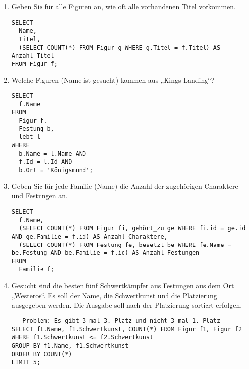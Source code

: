\documentclass{lehramt-informatik-aufgabe}
\begin{document}
\begin{enumerate}

%

\item Geben Sie für alle Figuren an, wie oft alle vorhandenen Titel
vorkommen.

\begin{antwort}
\begin{verbatim}
SELECT
  Name,
  Titel,
  (SELECT COUNT(*) FROM Figur g WHERE g.Titel = f.Titel) AS Anzahl_Titel
FROM Figur f;
\end{verbatim}
\end{antwort}

%

\item Welche Figuren (Name ist gesucht) kommen aus „Kings Landing“?

\begin{antwort}
\begin{verbatim}
SELECT
  f.Name
FROM
  Figur f,
  Festung b,
  lebt l
WHERE
  b.Name = l.Name AND
  f.Id = l.Id AND
  b.Ort = 'Königsmund';
\end{verbatim}
\end{antwort}

%

\item Geben Sie für jede Familie (Name) die Anzahl der zugehörigen
Charaktere und Festungen an.

\begin{antwort}
\begin{verbatim}
SELECT
  f.Name,
  (SELECT COUNT(*) FROM Figur fi, gehört_zu ge WHERE fi.id = ge.id AND ge.Familie = f.id) AS Anzahl_Charaktere,
  (SELECT COUNT(*) FROM Festung fe, besetzt be WHERE fe.Name = be.Festung AND be.Familie = f.id) AS Anzahl_Festungen
FROM
  Familie f;
\end{verbatim}
\end{antwort}

%

\item Gesucht sind die besten fünf Schwertkämpfer aus Festungen aus dem
Ort „Westeros“. Es soll der Name, die Schwertkunst und die Platzierung
ausgegeben werden. Die Ausgabe soll nach der Platzierung sortiert
erfolgen.

\begin{antwort}
\begin{verbatim}
-- Problem: Es gibt 3 mal 3. Platz und nicht 3 mal 1. Platz
SELECT f1.Name, f1.Schwertkunst, COUNT(*) FROM Figur f1, Figur f2
WHERE f1.Schwertkunst <= f2.Schwertkunst
GROUP BY f1.Name, f1.Schwertkunst
ORDER BY COUNT(*)
LIMIT 5;
\end{verbatim}
\end{antwort}


\end{enumerate}
\end{document}

